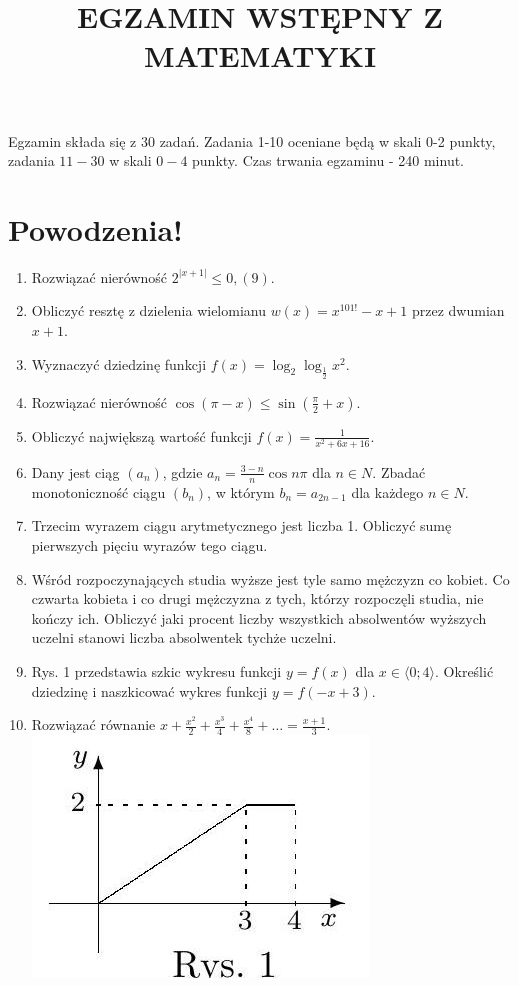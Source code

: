 \documentclass[10pt]{article}
\title{EGZAMIN WSTĘPNY Z MATEMATYKI }
\author{}
\date{}
\begin{document}
\maketitle
Egzamin składa się z 30 zadań. Zadania 1-10 oceniane będą w skali 0-2 punkty, zadania \(11-30\) w skali \(0-4\) punkty. Czas trwania egzaminu - 240 minut.

\section*{Powodzenia!}
\begin{enumerate}
  \item Rozwiązać nierówność \(2^{|x+1|} \leqslant 0,(9)\).
  \item Obliczyć resztę z dzielenia wielomianu \(w(x)=x^{101!}-x+1\) przez dwumian \(x+1\).
  \item Wyznaczyć dziedzinę funkcji \(f(x)=\log _{2} \log _{\frac{1}{2}} x^{2}\).
  \item Rozwiązać nierówność \(\cos (\pi-x) \leqslant \sin \left(\frac{\pi}{2}+x\right)\).
  \item Obliczyć największą wartość funkcji \(f(x)=\frac{1}{x^{2}+6 x+16}\).
  \item Dany jest ciąg \(\left(a_{n}\right)\), gdzie \(a_{n}=\frac{3-n}{n} \cos n \pi\) dla \(n \in N\). Zbadać monotoniczność ciągu \(\left(b_{n}\right)\), w którym \(b_{n}=a_{2 n-1}\) dla każdego \(n \in N\).
  \item Trzecim wyrazem ciągu arytmetycznego jest liczba 1. Obliczyć sumę pierwszych pięciu wyrazów tego ciągu.
  \item Wśród rozpoczynających studia wyższe jest tyle samo mężczyzn co kobiet. Co czwarta kobieta i co drugi mężczyzna z tych, którzy rozpoczęli studia, nie kończy ich. Obliczyć jaki procent liczby wszystkich absolwentów wyższych uczelni stanowi liczba absolwentek tychże uczelni.
  \item Rys. 1 przedstawia szkic wykresu funkcji \(y=f(x)\) dla \(x \in\langle 0 ; 4\rangle\). Określić dziedzinę i naszkicować wykres funkcji \(y=f(-x+3)\).
  \item Rozwiązać równanie \(x+\frac{x^{2}}{2}+\frac{x^{3}}{4}+\frac{x^{4}}{8}+\ldots=\frac{x+1}{3}\).\\
\includegraphics[max width=\textwidth, center]{2024_11_21_7f9effa233da5317fab2g-1}
\end{enumerate}
\end{document}

